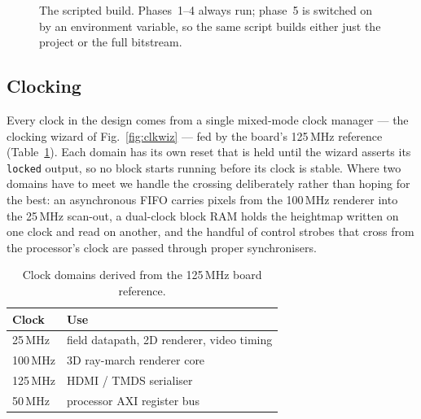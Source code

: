 \documentclass[11pt]{article}
\begin{document}
\begin{figure}[h]
\centering
{}
\caption{The scripted build. Phases~1--4 always run; phase~5 is switched on by
an environment variable, so the same script builds either just the project or
the full bitstream.}
\label{fig:build}
\end{figure}

\subsection{Clocking}

Every clock in the design comes from a single mixed-mode clock manager --- the
clocking wizard of Fig.~\ref{fig:clkwiz} --- fed by the board's 125\,MHz
reference (Table~\ref{tab:clocks}). Each domain has its own reset that is held
until the wizard asserts its \texttt{locked} output, so no block starts running
before its clock is stable. Where two domains have to meet we
handle the crossing deliberately rather than hoping for the best: an
asynchronous FIFO carries pixels from the 100\,MHz renderer into the 25\,MHz
scan-out, a dual-clock block RAM holds the heightmap written on one clock and
read on another, and the handful of control strobes that cross from the
processor's clock are passed through proper synchronisers.

\begin{table}[h]
\centering
\begin{tabular}{|l|l|}
\hline
Clock & Use \\
\hline
25\,MHz  & field datapath, 2D renderer, video timing \\
100\,MHz & 3D ray-march renderer core \\
125\,MHz & HDMI / TMDS serialiser \\
50\,MHz  & processor AXI register bus \\
\hline
\end{tabular}
\caption{Clock domains derived from the 125\,MHz board reference.}
\label{tab:clocks}
\end{table}
\end{document}

